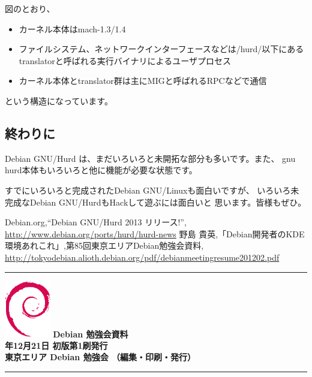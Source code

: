 \documentclass[mingoth,a4paper]{jsarticle}
\newcommand{\debmtgyear}{2013}
\newcommand{\debmtgmonth}{12}
\newcommand{\debmtgdate}{21}
\begin{document}
 図のとおり、

\begin{itemize}
\item カーネル本体はmach-1.3/1.4
\item ファイルシステム、ネットワークインターフェースなどは/hurd/以下にあるtranslatorと呼ばれる実行バイナリによるユーザプロセス
\item カーネル本体とtranslator群は主にMIGと呼ばれるRPCなどで通信
\end{itemize}

という構造になっています。

\subsection{終わりに}

 Debian GNU/Hurd は、まだいろいろと未開拓な部分も多いです。また、
gnu hurd本体もいろいろと他に機能が必要な状態です。

 すでにいろいろと完成されたDebian GNU/Linuxも面白いですが、
いろいろ未完成なDebian GNU/HurdもHackして遊ぶには面白いと
思います。皆様もぜひ。

\begin{thebibliography}{0}
    {\footnotesize{
       Debian.org,``Debian GNU/Hurd 2013 リリース!'',
       \url{http://www.debian.org/ports/hurd/hurd-news}
       }}
    {\footnotesize{
       野島 貴英,「Debian開発者のKDE環境あれこれ」,第85回東京エリアDebian勉強会資料,
       \url{http://tokyodebian.alioth.debian.org/pdf/debianmeetingresume201202.pdf}
       }}
\end{thebibliography}


\printindex

\cleartooddpage

\vspace*{15cm}
\hrule
\vspace{2mm}
\includegraphics[width=2cm]{image200502/openlogo-nd.eps}
\noindent \Large \bf Debian 勉強会資料\\
\noindent \normalfont \debmtgyear{}年\debmtgmonth{}月\debmtgdate{}日 \hspace{5mm}  初版第1刷発行\\
\noindent \normalfont 東京エリア Debian 勉強会 （編集・印刷・発行）\\
\hrule
\end{document}
